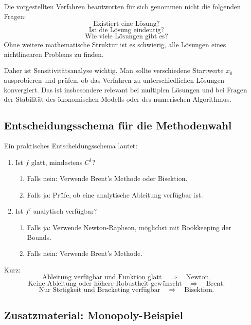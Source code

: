 \documentclass[10pt, letterpaper]{article}
\begin{document}
Die vorgestellten Verfahren beantworten für sich genommen nicht die folgenden Fragen:
\[
\text{Existiert eine Lösung?}
\]
\[
\text{Ist die Lösung eindeutig?}
\]
\[
\text{Wie viele Lösungen gibt es?}
\]
Ohne weitere mathematische Struktur ist es schwierig, alle Lösungen eines nichtlinearen Problems zu finden.

Daher ist Sensitivitätsanalyse wichtig. Man sollte verschiedene Startwerte \(x_0\) ausprobieren und prüfen, ob das Verfahren zu unterschiedlichen Lösungen konvergiert. Das ist insbesondere relevant bei multiplen Lösungen und bei Fragen der Stabilität des ökonomischen Modells oder des numerischen Algorithmus.

\subsection{Entscheidungsschema für die Methodenwahl}

Ein praktisches Entscheidungsschema lautet:

\begin{enumerate}
    \item Ist \(f\) glatt, mindestens \(C^1\)?
    \begin{enumerate}
        \item Falls nein: Verwende Brent's Methode oder Bisektion.
        \item Falls ja: Prüfe, ob eine analytische Ableitung verfügbar ist.
    \end{enumerate}

    \item Ist \(f'\) analytisch verfügbar?
    \begin{enumerate}
        \item Falls ja: Verwende Newton-Raphson, möglichst mit Bookkeeping der Bounds.
        \item Falls nein: Verwende Brent's Methode.
    \end{enumerate}
\end{enumerate}

Kurz:
\[
\text{Ableitung verfügbar und Funktion glatt}
\quad\Longrightarrow\quad
\text{Newton}.
\]
\[
\text{Keine Ableitung oder höhere Robustheit gewünscht}
\quad\Longrightarrow\quad
\text{Brent}.
\]
\[
\text{Nur Stetigkeit und Bracketing verfügbar}
\quad\Longrightarrow\quad
\text{Bisektion}.
\]

\subsection{Zusatzmaterial: Monopoly-Beispiel}
\end{document}
